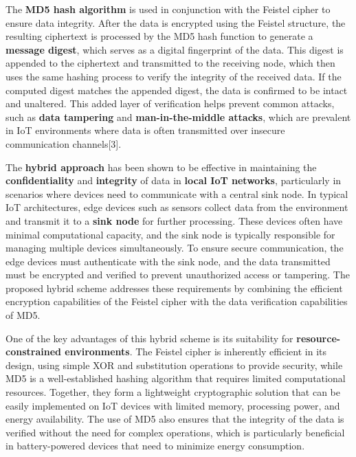 \documentclass{article}
\begin{document}
The \textbf{MD5 hash algorithm} is used in conjunction with the Feistel cipher to ensure data integrity. After the data is encrypted using the Feistel structure, the resulting ciphertext is processed by the MD5 hash function to generate a \textbf{message digest}, which serves as a digital fingerprint of the data. This digest is appended to the ciphertext and transmitted to the receiving node, which then uses the same hashing process to verify the integrity of the received data. If the computed digest matches the appended digest, the data is confirmed to be intact and unaltered. This added layer of verification helps prevent common attacks, such as \textbf{data tampering} and \textbf{man-in-the-middle attacks}, which are prevalent in IoT environments where data is often transmitted over insecure communication channels[3].

The \textbf{hybrid approach} has been shown to be effective in maintaining the \textbf{confidentiality} and \textbf{integrity} of data in \textbf{local IoT networks}, particularly in scenarios where devices need to communicate with a central sink node. In typical IoT architectures, edge devices such as sensors collect data from the environment and transmit it to a \textbf{sink node} for further processing. These devices often have minimal computational capacity, and the sink node is typically responsible for managing multiple devices simultaneously. To ensure secure communication, the edge devices must authenticate with the sink node, and the data transmitted must be encrypted and verified to prevent unauthorized access or tampering. The proposed hybrid scheme addresses these requirements by combining the efficient encryption capabilities of the Feistel cipher with the data verification capabilities of MD5.

One of the key advantages of this hybrid scheme is its suitability for \textbf{resource-constrained environments}. The Feistel cipher is inherently efficient in its design, using simple XOR and substitution operations to provide security, while MD5 is a well-established hashing algorithm that requires limited computational resources. Together, they form a lightweight cryptographic solution that can be easily implemented on IoT devices with limited memory, processing power, and energy availability. The use of MD5 also ensures that the integrity of the data is verified without the need for complex operations, which is particularly beneficial in battery-powered devices that need to minimize energy consumption.
\end{document}
